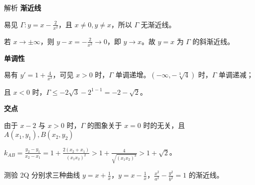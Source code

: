 \documentclass{ctexart}
\begin{document}
\begin{analysisBox}{解析}
    \textbf{渐近线}
    
    易见 $\Gamma: y = x - \frac{2}{x^2}$，且 $x \neq 0, y \neq x$，所以 $\Gamma$ 无渐近线。
    
    若 $x \to \pm\infty$，则 $y - x = -\frac{2}{x^2} \to 0$，即 $y \to x$。故 $y = x$ 为 $\Gamma$ 的斜渐近线。
    
    \textbf{单调性}
    
    易有 $y' = 1 + \frac{4}{x^3}$，可见 $x > 0$ 时，$\Gamma$ 单调递增。$\left(-\infty, -\sqrt[3]{4}\right)$ 时，$\Gamma$ 单调递减；
    
    且 $x < 0$ 时，$\Gamma \leq -2\sqrt{3} - 2^{1-1} = -2 - \sqrt{2}$。
    
    \textbf{交点}
    
    由于 $x - 2$ 与 $x > 0$ 时，$\Gamma$ 的图象关于 $x = 0$ 时的无关，且 $A(x_1, y_1), B(x_2, y_2)$
    
    $k_{AB} = \frac{y_2 - y_1}{x_2 - x_1} = 1 + \frac{2(x_2 + x_1)}{(x_1 x_2)^2} > 1 + \frac{4}{\sqrt{(x_1 x_2)^3}} > 1 + \sqrt{2}$。
\end{analysisBox}

\vspace{1em}

\begin{quizBox}{测验 2Q}
    分别求三种曲线 $y = x + \frac{1}{x}$，$y = x - \frac{1}{x}$，$\frac{x^2}{a^2} - \frac{y^2}{b^2} = 1$ 的渐近线。
\end{quizBox}
\end{document}
